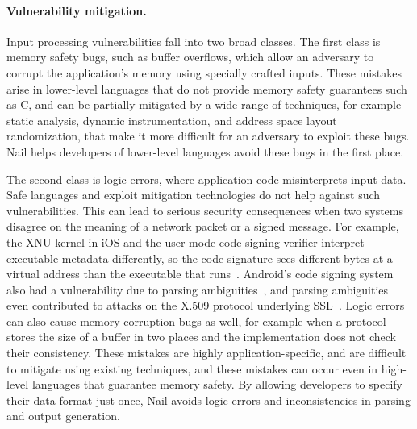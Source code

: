 \paragraph{Vulnerability mitigation.}

Input processing vulnerabilities fall into two broad classes.  The first
class is memory safety bugs, such as buffer overflows, which allow an
adversary to corrupt the application's memory using specially crafted
inputs.  These mistakes arise in lower-level languages that do not
provide memory safety guarantees such as C, and can be partially
mitigated by a wide range of techniques, for example static analysis,
dynamic instrumentation, and address space layout randomization, that
make it more difficult for an adversary to exploit these bugs.
Nail helps developers of lower-level languages avoid these bugs
in the first place.

The second class is logic errors, where application code misinterprets
input data. Safe languages and exploit mitigation technologies do not
help against such vulnerabilities. This can lead to serious security
consequences when two systems disagree on the meaning of a network
packet or a signed message.  For example, the XNU kernel in iOS and the
user-mode code-signing verifier interpret executable metadata differently,
so the code signature sees different bytes at a virtual address than the
executable that runs~\cite{evaders6}.  Android's code signing system also
had a vulnerability due to parsing ambiguities~\cite{saurik-masterkey},
and parsing ambiguities even contributed to attacks on the X.509 protocol
underlying SSL~\cite{DBLP:conf/fc/KaminskyPS10}.  Logic errors can also
cause memory corruption bugs as well, for example when a protocol stores
the size of a buffer in two places and the implementation does not check
their consistency. These mistakes are highly application-specific, and
are difficult to mitigate using existing techniques, and these mistakes
can occur even in high-level languages that guarantee memory safety. By
allowing developers to specify their data format just once, Nail avoids
logic errors and inconsistencies in parsing and output generation.


